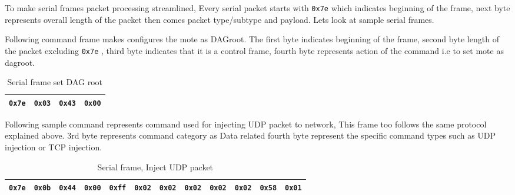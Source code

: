 To make serial frames packet processing streamlined, Every serial packet starts with \texttt{0x7e} which indicates beginning of the frame, next byte represents overall length of the packet then comes packet type/subtype and payload.
Lets look at sample serial frames.

Following command frame makes configures the mote as DAGroot. The first byte indicates beginning of the frame, second byte length of the packet excluding \texttt{0x7e} , third byte indicates that it is a control frame, fourth byte represents action of the command i.e to set mote as dagroot.

\begin{table}[H]
	\renewcommand{\arraystretch}{1.3}
	\label{meas:set dag root command}
	\centering
	\begin{tabular}{|c|c|c|c|}
		\hline
		\texttt{0x7e} & \texttt{0x03} & \texttt{0x43} & \texttt{0x00} \\
		\hline
	\end{tabular}
	\caption{Serial frame set DAG root}
\end{table}

Following sample command represents command used for injecting UDP packet to network, This frame too follows the same protocol explained above. 3rd byte represents command category as Data related fourth byte represent the specific command types such as UDP injection or TCP injection.

\begin{table}[H]
	\renewcommand{\arraystretch}{1.3}
	\label{meas:UDP_inject}
	\centering
	\begin{tabular}{|c|c|c|c||c|c|c|c||c|c|c|c|}
		\hline
		\texttt{0x7e} & \texttt{0x0b} & \texttt{0x44} & \texttt{0x00} & \texttt{0xff} & \texttt{0x02} & \texttt{0x02} & \texttt{0x02} & \texttt{0x02} & \texttt{0x02} & \texttt{0x58} & \texttt{0x01} \\
		\hline
	\end{tabular}
	\caption{Serial frame, Inject UDP packet}
\end{table}

